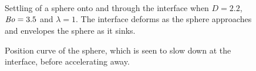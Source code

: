 \documentclass[12pt]{article}
\newcommand\Bo{\mbox{\textit{Bo}}}  %
\begin{document}
    \begin{figure}
      \centering
      \begin{subfigure}[b]{0.45\textwidth}
        \resizebox{\textwidth}{!}{\Large }
        \caption{}
        \label{fig:sinking_frame1}
      \end{subfigure}
      ~
      \begin{subfigure}[b]{0.45\textwidth}
        \resizebox{\textwidth}{!}{\Large }
        \caption{}
        \label{fig:sinking_frame2}
      \end{subfigure}
      
      \begin{subfigure}[b]{0.45\textwidth}
        \resizebox{\textwidth}{!}{\Large }
        \caption{}
        \label{fig:sinking_frame3}
      \end{subfigure}
      ~
      \begin{subfigure}[b]{0.45\textwidth}
        \resizebox{\textwidth}{!}{\Large }
        \caption{}
        \label{fig:sinking_frame4}
      \end{subfigure}
      
      \begin{subfigure}[b]{0.45\textwidth}
        \resizebox{\textwidth}{!}{\Large }
        \caption{}
        \label{fig:sinking_frame5}
      \end{subfigure}
      ~
      \begin{subfigure}[b]{0.45\textwidth}
        \resizebox{\textwidth}{!}{\large }
        \caption{}
        \label{fig:sinking_frame6}
      \end{subfigure}
      \caption{Settling of a sphere onto and through the interface when $D = 2.2$, $\Bo = 3.5$ and $\lambda = 1$. The interface deforms as the sphere approaches and envelopes the sphere as it sinks.}\label{fig:sinking_frame}
    \end{figure}

  \begin{figure}
    \resizebox{0.9\textwidth}{!}{\Large }
    \caption{Position curve of the sphere, which is seen to slow down at the interface, before accelerating away.\label{fig:sinking_traj}}
  \end{figure}
\end{document}

